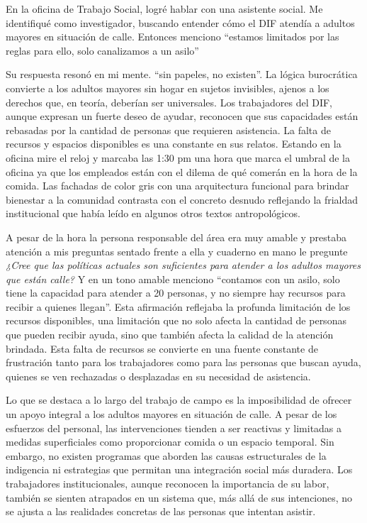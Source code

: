 \documentclass[
  spanish,
  11pt,
  a4paper,
]{scrbook}
\begin{document}
En la oficina de Trabajo Social, logré hablar con una asistente social.
Me identifiqué como investigador, buscando entender cómo el DIF atendía
a adultos mayores en situación de calle. Entonces menciono ``estamos
limitados por las reglas para ello, solo canalizamos a un asilo''

Su respuesta resonó en mi mente. ``sin papeles, no existen''. La lógica
burocrática convierte a los adultos mayores sin hogar en sujetos
invisibles, ajenos a los derechos que, en teoría, deberían ser
universales. Los trabajadores del DIF, aunque expresan un fuerte deseo
de ayudar, reconocen que sus capacidades están rebasadas por la cantidad
de personas que requieren asistencia. La falta de recursos y espacios
disponibles es una constante en sus relatos. Estando en la oficina mire
el reloj y marcaba las 1:30 pm una hora que marca el umbral de la
oficina ya que los empleados están con el dilema de qué comerán en la
hora de la comida. Las fachadas de color gris con una arquitectura
funcional para brindar bienestar a la comunidad contrasta con el
concreto desnudo reflejando la frialdad institucional que había leído en
algunos otros textos antropológicos.

A pesar de la hora la persona responsable del área era muy amable y
prestaba atención a mis preguntas sentado frente a ella y cuaderno en
mano le pregunte \emph{¿Cree que las políticas actuales son suficientes
para atender a los adultos mayores que están calle?} Y en un tono amable
menciono ``contamos con un asilo, solo tiene la capacidad para atender a
20 personas, y no siempre hay recursos para recibir a quienes llegan''.
Esta afirmación reflejaba la profunda limitación de los recursos
disponibles, una limitación que no solo afecta la cantidad de personas
que pueden recibir ayuda, sino que también afecta la calidad de la
atención brindada. Esta falta de recursos se convierte en una fuente
constante de frustración tanto para los trabajadores como para las
personas que buscan ayuda, quienes se ven rechazadas o desplazadas en su
necesidad de asistencia.

Lo que se destaca a lo largo del trabajo de campo es la imposibilidad de
ofrecer un apoyo integral a los adultos mayores en situación de calle. A
pesar de los esfuerzos del personal, las intervenciones tienden a ser
reactivas y limitadas a medidas superficiales como proporcionar comida o
un espacio temporal. Sin embargo, no existen programas que aborden las
causas estructurales de la indigencia ni estrategias que permitan una
integración social más duradera. Los trabajadores institucionales,
aunque reconocen la importancia de su labor, también se sienten
atrapados en un sistema que, más allá de sus intenciones, no se ajusta a
las realidades concretas de las personas que intentan asistir.
\end{document}
